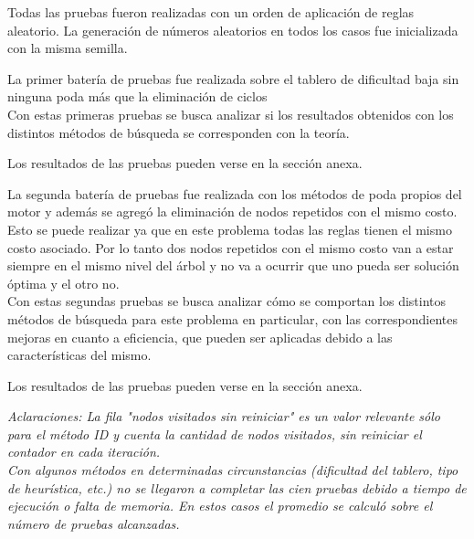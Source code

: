 \documentclass[10pt,journal,compsoc]{IEEEtran}
\begin{document}
Todas las pruebas fueron realizadas con un orden de aplicaci\'on de reglas aleatorio. La generaci\'on de n\'umeros aleatorios en todos los casos fue inicializada con la misma semilla.

La primer bater\'ia de pruebas fue realizada sobre el tablero de dificultad baja sin ninguna poda m\'as que la eliminaci\'on de ciclos\\ Con estas primeras pruebas se busca analizar si los resultados obtenidos con los distintos m\'etodos de b\'usqueda se corresponden con la teor\'ia.

Los resultados de las pruebas pueden verse en la secci\'on anexa.

La segunda bater\'ia de pruebas fue realizada con los m\'etodos de poda propios del motor y adem\'as se agreg\'o la eliminaci\'on de nodos repetidos con el mismo costo. Esto se puede realizar ya que en este problema todas las reglas tienen el mismo costo asociado. Por lo tanto dos nodos repetidos con el mismo costo van a estar siempre en el mismo nivel del \'arbol y no va a ocurrir que uno pueda ser soluci\'on \'optima y el otro no.\\
Con estas segundas pruebas se busca analizar c\'omo se comportan los distintos m\'etodos de b\'usqueda para este problema en particular, con las correspondientes mejoras en cuanto a eficiencia, que pueden ser aplicadas debido a las caracter\'isticas del mismo.

Los resultados de las pruebas pueden verse en la secci\'on anexa.

\textit{Aclaraciones: 
La fila "nodos visitados sin reiniciar" es un valor relevante s\'olo para el m\'etodo ID y cuenta la cantidad de nodos visitados, sin reiniciar el contador en cada iteraci\'on.\\
Con algunos m\'etodos en determinadas circunstancias (dificultad del tablero, tipo de heur\'istica, etc.) no se llegaron a completar las cien pruebas debido a tiempo de ejecuci\'on o falta de memoria. En estos casos el promedio se calcul\'o sobre el n\'umero de pruebas alcanzadas.}

\end{document}
